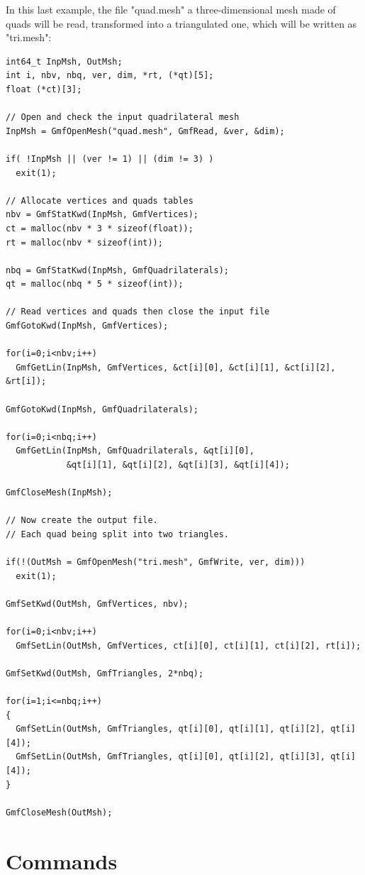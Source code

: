\documentclass[a4paper,12pt]{article}
\begin{document}
In this last example, the file "quad.mesh" a three-dimensional mesh made of quads will be read, transformed into a triangulated one, which will be written as "tri.mesh":

\begin{tt}
\begin{verbatim}
int64_t InpMsh, OutMsh;
int i, nbv, nbq, ver, dim, *rt, (*qt)[5];
float (*ct)[3];

// Open and check the input quadrilateral mesh
InpMsh = GmfOpenMesh("quad.mesh", GmfRead, &ver, &dim);

if( !InpMsh || (ver != 1) || (dim != 3) )
  exit(1);

// Allocate vertices and quads tables
nbv = GmfStatKwd(InpMsh, GmfVertices);
ct = malloc(nbv * 3 * sizeof(float));
rt = malloc(nbv * sizeof(int));

nbq = GmfStatKwd(InpMsh, GmfQuadrilaterals);
qt = malloc(nbq * 5 * sizeof(int));

// Read vertices and quads then close the input file
GmfGotoKwd(InpMsh, GmfVertices);

for(i=0;i<nbv;i++)
  GmfGetLin(InpMsh, GmfVertices, &ct[i][0], &ct[i][1], &ct[i][2], &rt[i]);

GmfGotoKwd(InpMsh, GmfQuadrilaterals);

for(i=0;i<nbq;i++)
  GmfGetLin(InpMsh, GmfQuadrilaterals, &qt[i][0],
            &qt[i][1], &qt[i][2], &qt[i][3], &qt[i][4]);

GmfCloseMesh(InpMsh);

// Now create the output file.
// Each quad being split into two triangles.

if(!(OutMsh = GmfOpenMesh("tri.mesh", GmfWrite, ver, dim)))
  exit(1);

GmfSetKwd(OutMsh, GmfVertices, nbv);

for(i=0;i<nbv;i++)
  GmfSetLin(OutMsh, GmfVertices, ct[i][0], ct[i][1], ct[i][2], rt[i]);

GmfSetKwd(OutMsh, GmfTriangles, 2*nbq);

for(i=1;i<=nbq;i++)
{
  GmfSetLin(OutMsh, GmfTriangles, qt[i][0], qt[i][1], qt[i][2], qt[i][4]);
  GmfSetLin(OutMsh, GmfTriangles, qt[i][0], qt[i][2], qt[i][3], qt[i][4]);
}

GmfCloseMesh(OutMsh);
\end{verbatim}
\end{tt}
\normalfont


%
%

\newpage
\section{Commands}
\end{document}
